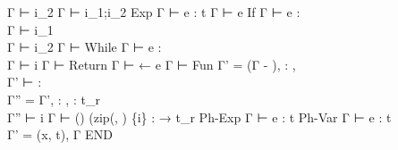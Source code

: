 {{{               Γ ⊢ i_2
             }{
               Γ ⊢ i_1;i_2
             }
         }
    {Exp}{ 
             { Γ ⊢ e : t }
             { Γ ⊢ e }
         }
    {If}{ 
            { Γ ⊢ e : \tInt \\
              Γ ⊢ i_1 \\
              Γ ⊢ i_2
            }
            { Γ ⊢  }
        }
    {While}{ 
               { Γ ⊢ e : \tInt \\
                 Γ ⊢ i
               }
               { Γ ⊢  }
           }
    {Return}{ 
                { Γ ⊢ \vRet ← e }
                { Γ ⊢  }
            }
    {Fun}{ 
             { Γ' = (Γ - \vRet),
                     : , \\
               Γ' ⊢  :  \\
               Γ'' = Γ',
                      : ,
                     \vRet : t_r \\
               Γ'' ⊢ i
             }
             { Γ ⊢  ()
                   (\textrm{zip}(, ) \{i\}
                    :  → t_r
             }
         }
    {Ph-Exp}{ 
                { Γ ⊢ e : t }
                {  }
            }
    {Ph-Var}{ 
                { Γ ⊢ e : t \\
                  Γ' = (x, t), Γ
                }
                {  }
            }
    {END}
}

